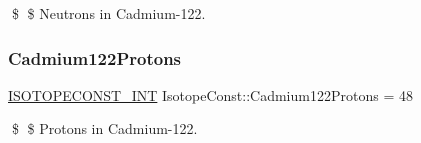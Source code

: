\$ \$ Neutrons in Cadmium-\/122. \mbox{\label{group___isotope_const-_cadmium-_cd122_gaa6ed6349007bbcc4d22b36279a41c9ab}} 
\subsubsection{\texorpdfstring{Cadmium122\+Protons}{Cadmium122Protons}}
{\footnotesize\ttfamily \mbox{\hyperlink{group___isotope_const-_macros_ga5f18360b3e99483a35c32d789e62621c}{I\+S\+O\+T\+O\+P\+E\+C\+O\+N\+S\+T\+\_\+\+I\+NT}} Isotope\+Const\+::\+Cadmium122\+Protons = 48}

\$ \$ Protons in Cadmium-\/122. 